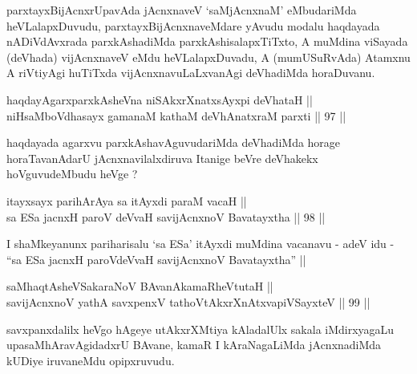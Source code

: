 \begin{artha}
\footnotemark[2]parxtayxBijAcnxrUpavAda jAcnxnaveV `saMjAcnxnaM' eMbudariMda
heVLalapxDuvudu, parxtayxBijAcnxnaveMdare yAvudu modalu haqdayada
nADiVdAvxrada parxkAshadiMda parxkAshisalapxTiTxto, A muMdina viSayada
(deVhada) vijAcnxnaveV eMdu heVLalapxDuvadu, A (mumUSuRvAda) Atamxnu A
riVtiyAgi huTiTxda vijAcnxnavuLaLxvanAgi deVhadiMda horaDuvanu.
\end{artha}


\begin{shl}
haqdayAgarxparxkAsheVna niSAkxrXnatxsAyxpi deVhataH || \\
niHsaMboVdhasayx gamanaM kathaM deVhAnatxraM parxti \hfill || 97 || 
\end{shl}

\begin{artha}
haqdayada agarxvu parxkAshavAguvudariMda deVhadiMda horage
horaTavanAdarU jAcnxnavilalxdiruva Itanige beVre deVhakekx
hoVguvudeMbudu heVge ?
\end{artha}


\begin{shl}
itayxsayx parihArAya sa itAyxdi paraM vacaH || \\
sa ESa jacnxH paroV deVvaH savijAcnxnoV Bavatayxtha \hfill || 98 ||  
\end{shl}

\begin{artha}
I shaMkeyanunx pariharisalu `sa ESa' itAyxdi muMdina vacanavu - adeV
idu - ``sa ESa jacnxH paroVdeVvaH savijAcnxnoV Bavatayxtha'' || 
\end{artha}


\begin{shl}
saMhaqtAsheVSakaraNoV BAvanAkamaRheVtutaH || \\
savijAcnxnoV yathA savxpenxV tathoVtAkxrXnAtxvapiVSayxteV \hfill || 99 ||  
\end{shl}

\begin{artha}
savxpanxdalilx heVgo hAgeye utAkxrXMtiya kAladalUlx sakala
iMdirxyagaLu upasaMhAravAgidadxrU BAvane, kamaR I kAraNagaLiMda
jAcnxnadiMda kUDiye iruvaneMdu opipxruvudu.
\end{artha}


